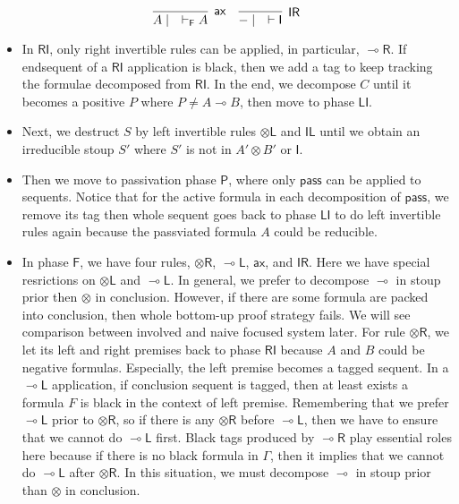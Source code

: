 \documentclass[submission,copyright,creativecommons]{eptcs}
\newcommand{\tl}{\otimes \mathsf{L}}
\newcommand{\tr}{\otimes \mathsf{R}}
\newcommand{\lright}{\multimap \mathsf{R}}
\newcommand{\lleft}{\multimap \mathsf{L}}
\newcommand{\pass}{\mathsf{pass}}
\newcommand{\unitl}{\mathsf{IL}}
\newcommand{\unitr}{\mathsf{IR}}
\newcommand{\ax}{\mathsf{ax}}
\newcommand{\ot}{\otimes}
\newcommand{\lolli}{\multimap}
\newcommand{\I}{\mathsf{I}}
\newcommand{\RI}{\mathsf{RI}}
\newcommand{\LI}{\mathsf{LI}}
\newcommand{\Pass}{\mathsf{P}}
\newcommand{\F}{\mathsf{F}}
\begin{document}
\begin{displaymath}
  \infer[\ax]{A \mid \quad \vdash_{\F} A}{}
  \quad
  \infer[\unitr]{- \mid \quad \vdash \I}{}
\end{displaymath}
\begin{itemize}
  \item In $\RI$, only right invertible rules can be applied, in particular, $\lright$.
  If endsequent of a $\RI$ application is black, then we add a tag to keep tracking the formulae decomposed from $\RI$.
  In the end, we decompose $C$ until it becomes a positive $P$ where $P \neq A \lolli B$, then move to phase $\LI$.
  \item Next, we destruct $S$ by left invertible rules $\tl$ and $\unitl$ until we obtain an irreducible stoup $S'$ where $S'$ is not in $A' \ot B'$ or $\I$.
  \item Then we move to passivation phase $\Pass$, where only $\pass$ can be applied to sequents.
  Notice that for the active formula in each decomposition of $\pass$, we remove its tag then whole sequent goes back to phase $\LI$ to do left invertible rules again because the passviated formula $A$ could be reducible.
  \item In phase $\F$, we have four rules, $\tr$, $\lleft$, $\ax$, and $\unitr$.
  Here we have special resrictions on $\tl$ and $\lleft$.
  In general, we prefer to decompose $\lolli$ in stoup prior then $\ot$ in conclusion.
  However, if there are some formula are packed into conclusion, then whole bottom-up proof strategy fails.
  We will see comparison between involved and naive focused system later.
  For rule $\tr$, we let its left and right premises back to phase $\RI$ because $A$ and $B$ could be negative formulas.
  Especially, the left premise becomes a tagged sequent.
  In a $\lleft$ application, if conclusion sequent is tagged, then at least exists a formula $F$ is black in the context of left premise.
  Remembering that we prefer $\lleft$ prior to $\tr$, so if there is any $\tr$ before $\lleft$, then we have to ensure that we cannot do $\lleft$ first.
  Black tags produced by $\lright$ play essential roles here because if there is no black formula in $\Gamma$, then it implies that we cannot do $\lleft$ after $\tr$.
  In this situation, we must decompose $\lolli$ in stoup prior than $\ot$ in conclusion.
\end{itemize}
\end{document}
